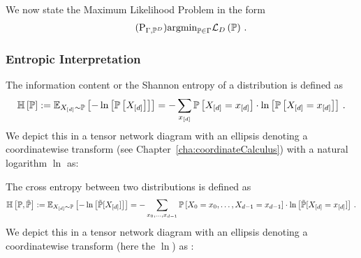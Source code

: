We now state the Maximum Likelihood Problem in the form
\begin{align}\tag{$\mathrm{P}_{\Gamma, \empdistribution}$}\label{prob:parameterMaxLikelihood}
	\argmin_{\probtensor\in\Gamma} \lossof{\probtensor} \, . %
\end{align}








\subsubsection{Entropic Interpretation}

\begin{definition}
	The information content or the Shannon entropy of a distribution is defined as
		\[ \mathbb{H}\left[\mathbb{P}\right] 
		:= \mathbb{E}_{X_{[d]}\sim\mathbb{P}}\left[-\ln \left[ \mathbb{P}\left[X_{[d]}\right] \right]\right] 
		= - \sum_{x_{[d]}} \mathbb{P}\left[X_{[d]}=x_{[d]}\right] \cdot \ln \left[ \mathbb{P}\left[X_{[d]}=x_{[d]}\right] \right] \, . \]
	We depict this in a tensor network diagram with an ellipsis denoting a coordinatewise transform (see Chapter~\ref{cha:coordinateCalculus}) with a natural logarithm $\ln$ as:
	\begin{center}
		
	\end{center}
\end{definition}


\begin{definition}\label{def:crossEntropy}
	The cross entropy between two distributions is defined as 
		\[ \mathbb{H}\left[\mathbb{P},\tilde{\mathbb{P}}\right] 
		:=  \mathbb{E}_{X_{[d]}\sim\mathbb{P}}\left[-\ln \left[ \tilde{\mathbb{P}}[X_{[d]}] \right]\right] 
		= - \sum_{x_{0},\ldots,x_{d-1}}  \mathbb{P}\left[X_{0}=x_{0},\ldots,X_{d-1}=x_{d-1}\right] \cdot \ln \left[ \tilde{\mathbb{P}}[X_{[d]}=x_{[d]}] \right]  \, . \]
	We depict this in a tensor network diagram with an ellipsis denoting a coordinatewise transform (here the $\ln$) as :
	\begin{center}
		
	\end{center}
\end{definition}


